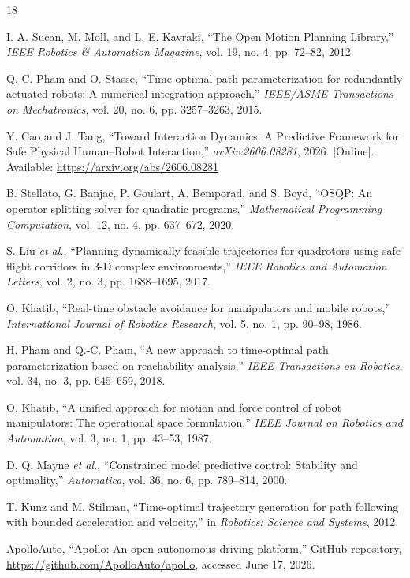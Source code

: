 \begin{thebibliography}{18}

I. A. Sucan, M. Moll, and L. E. Kavraki, ``The Open Motion Planning Library,'' \emph{IEEE Robotics \& Automation Magazine}, vol. 19, no. 4, pp. 72--82, 2012.

Q.-C. Pham and O. Stasse, ``Time-optimal path parameterization for redundantly actuated robots: A numerical integration approach,'' \emph{IEEE/ASME Transactions on Mechatronics}, vol. 20, no. 6, pp. 3257--3263, 2015.

Y. Cao and J. Tang, ``Toward Interaction Dynamics: A Predictive Framework for Safe Physical Human--Robot Interaction,'' \emph{arXiv:2606.08281}, 2026. [Online]. Available: \url{https://arxiv.org/abs/2606.08281}

B. Stellato, G. Banjac, P. Goulart, A. Bemporad, and S. Boyd, ``OSQP: An operator splitting solver for quadratic programs,'' \emph{Mathematical Programming Computation}, vol. 12, no. 4, pp. 637--672, 2020.

S. Liu \emph{et al.}, ``Planning dynamically feasible trajectories for quadrotors using safe flight corridors in 3-D complex environments,'' \emph{IEEE Robotics and Automation Letters}, vol. 2, no. 3, pp. 1688--1695, 2017.

O. Khatib, ``Real-time obstacle avoidance for manipulators and mobile robots,'' \emph{International Journal of Robotics Research}, vol. 5, no. 1, pp. 90--98, 1986.

H. Pham and Q.-C. Pham, ``A new approach to time-optimal path parameterization based on reachability analysis,'' \emph{IEEE Transactions on Robotics}, vol. 34, no. 3, pp. 645--659, 2018.

O. Khatib, ``A unified approach for motion and force control of robot manipulators: The operational space formulation,'' \emph{IEEE Journal on Robotics and Automation}, vol. 3, no. 1, pp. 43--53, 1987.

D. Q. Mayne \emph{et al.}, ``Constrained model predictive control: Stability and optimality,'' \emph{Automatica}, vol. 36, no. 6, pp. 789--814, 2000.

T. Kunz and M. Stilman, ``Time-optimal trajectory generation for path following with bounded acceleration and velocity,'' in \emph{Robotics: Science and Systems}, 2012.

ApolloAuto, ``Apollo: An open autonomous driving platform,'' GitHub repository, \url{https://github.com/ApolloAuto/apollo}, accessed June 17, 2026.


\end{thebibliography}
